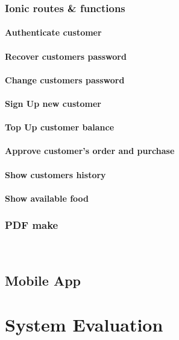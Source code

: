 	\subsection{Ionic routes \& functions}
		\subsubsection{Authenticate customer}
		\subsubsection{Recover customers password}
		\subsubsection{Change customers password}
		\subsubsection{Sign Up new customer}
		\subsubsection{Top Up customer balance}
		\subsubsection{Approve customer's order and purchase}
		\subsubsection{Show customers history}
		\subsubsection{Show available food}
	
	

\subsection{PDF make}

~\cite{PDF_Make_module}



  \section{Mobile App}


\chapter{System Evaluation}	%
